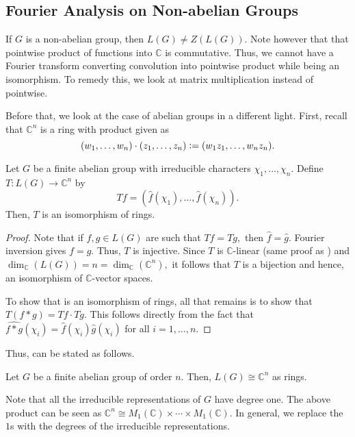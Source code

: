 \subsection{Fourier Analysis on Non-abelian Groups}

If $G$ is a non-abelian group, then $L(G) \neq Z(L(G)).$ Note however that that pointwise product of functions into $\mathbb{C}$ is commutative. Thus, we cannot have a Fourier transform converting convolution into pointwise product while being an isomorphism. To remedy this, we look at matrix multiplication instead of pointwise.

Before that, we look at the case of abelian groups in a different light. First, recall that $\mathbb{C}^n$ is a ring with product given as
\begin{equation*} 
    (w_1, \ldots, w_n) \cdot (z_1, \ldots, z_n) \vcentcolon= (w_1z_1, \ldots, w_nz_n).
\end{equation*}

\begin{prop}
    Let $G$ be a finite abelian group with irreducible characters $\chi_1, \ldots, \chi_n.$ Define $T : L(G) \to \mathbb{C}^n$ by
    \begin{equation*} 
        Tf = (\widehat{f}(\chi_1), \ldots, \widehat{f}(\chi_n)).
    \end{equation*}
    Then, $T$ is an isomorphism of rings.
\end{prop}
\begin{proof} 
    Note that if $f, g \in L(G)$ are such that $Tf = Tg,$ then $\widehat{f} = \widehat{g}.$ Fourier inversion gives $f = g.$ Thus, $T$ is injective. Since $T$ is $\mathbb{C}$-linear (same proof as ) and $\dim_{\mathbb{C}}(L(G)) = n = \dim_{\mathbb{C}}(\mathbb{C}^n),$ it follows that $T$ is a bijection and hence, an isomorphism of $\mathbb{C}$-vector spaces.

    To show that is an isomorphism of rings, all that remains is to show that $T(f * g) = Tf \cdot Tg.$ This follows directly from the fact that $\widehat{f * g}(\chi_i) = \widehat{f}(\chi_i)\widehat{g}(\chi_i)$ for all $i = 1, \ldots, n.$
\end{proof}

Thus,  can be stated as follows.
\begin{thm}
    Let $G$ be a finite abelian group of order $n.$ Then, $L(G) \cong \mathbb{C}^n$ as rings.
\end{thm}

Note that all the irreducible representations of $G$ have degree one. The above product can be seen as $\mathbb{C}^n \cong M_1(\mathbb{C}) \times \cdots \times M_1(\mathbb{C}).$ In general, we replace the $1$s with the degrees of the irreducible representations.

